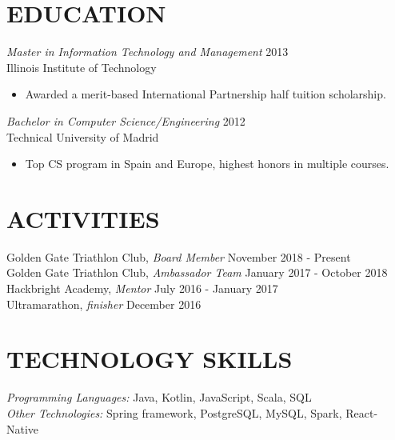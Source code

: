 \documentclass[overlapped, 10pt]{res} %
\begin{document}
\begin{resume}
 
\section{EDUCATION}\smallskip

{\sl Master in Information Technology and Management} \hfill 2013 \\
Illinois Institute of Technology
\begin{itemize}
\item Awarded a merit-based International Partnership half tuition scholarship.
\end{itemize} 

{\sl Bachelor in Computer Science/Engineering} \hfill 2012 \\
Technical University of Madrid
\begin{itemize} \itemsep -2pt %
\item Top CS program in Spain and Europe, highest honors in multiple courses.
\end{itemize}


\section{ACTIVITIES}\smallskip

Golden Gate Triathlon Club, {\sl Board Member} \hfill November 2018 - Present\\
Golden Gate Triathlon Club, {\sl Ambassador Team} \hfill January 2017 - October 2018\\
Hackbright Academy, {\sl Mentor} \hfill July 2016 - January 2017\\
Ultramarathon, {\sl finisher} \hfill December 2016 \\


\section{TECHNOLOGY SKILLS}\smallskip

{\sl Programming Languages:} Java, Kotlin, JavaScript, Scala, SQL \\
{\sl Other Technologies:} Spring framework, PostgreSQL, MySQL, Spark, React-Native \\
 

\end{resume}
\end{document}
